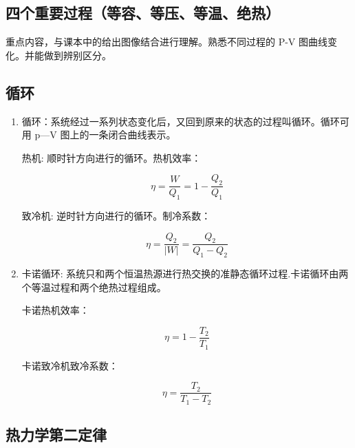 \documentclass{ctexbook}
\begin{document}
\subsection{四个重要过程（等容、等压、等温、绝热）}
    
重点内容，与课本中的给出图像结合进行理解。熟悉不同过程的 P-V 图曲线变化。并能做到辨别区分。
    
\subsection{循环}

\begin{enumerate}
    \item 循环：系统经过一系列状态变化后，又回到原来的状态的过程叫循环。循环可用 p—V 图上的一条闭合曲线表示。
    
    热机: 顺时针方向进行的循环。热机效率：
    
    $$ \eta = \frac{W}{Q_1} = 1 - \frac{Q_2}{Q_1} $$
    
    致冷机: 逆时针方向进行的循环。制冷系数：

    $$ \eta = \frac{Q_2}{|W|} = \frac{Q_2}{Q_1 - Q_2} $$
    
    \item 卡诺循环: 系统只和两个恒温热源进行热交换的准静态循环过程.卡诺循环由两个等温过程和两个绝热过程组成。
    
    卡诺热机效率：
    
    $$ \eta = 1 - \frac{T_2}{T_1} $$
    
    卡诺致冷机致冷系数：
    
    $$ \eta = \frac{T_2}{T_1 - T_2} $$

\end{enumerate}

\subsection{热力学第二定律}
\end{document}
